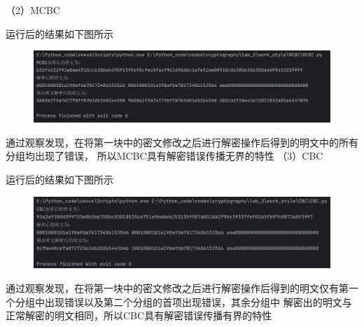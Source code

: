 \documentclass[a4paper,11pt,UTF8]{ctexart}
\newcommand{\bottomcaption}{%
\setlength{\abovecaptionskip}{6pt}%
\setlength{\belowcaptionskip}{6pt}%
\caption}
\newcommand{\xiaowuhao}{\fontsize{9pt}{\baselineskip}\selectfont}   %
\begin{document}
            （2）MCBC\par
                运行后的结果如下图所示
                \begin{figure}[H]
                    \centering
                    \includegraphics[width=13cm]{MCBC_result_3.png}
                    \bottomcaption{\xiaowuhao{MCBC修改一位密文后两次加密结果}}
                \end{figure}
                通过观察发现，在将第一块中的密文修改之后进行解密操作后得到的明文中的所有分组均出现了错误，
                所以MCBC具有解密错误传播无界的特性
\newpage
            （3）CBC\par
                运行后的结果如下图所示
                \begin{figure}[H]
                    \centering
                    \includegraphics[width=13cm]{CBC_result_3.png}
                    \bottomcaption{\xiaowuhao{CBC修改一位密文后两次加密结果}}
                \end{figure}
                通过观察发现，在将第一块中的密文修改之后进行解密操作后得到的明文仅有第一个分组中出现错误以及第二个分组的首项出现错误，其余分组中
                解密出的明文与正常解密的明文相同，所以CBC具有解密错误传播有界的特性
\end{document}
